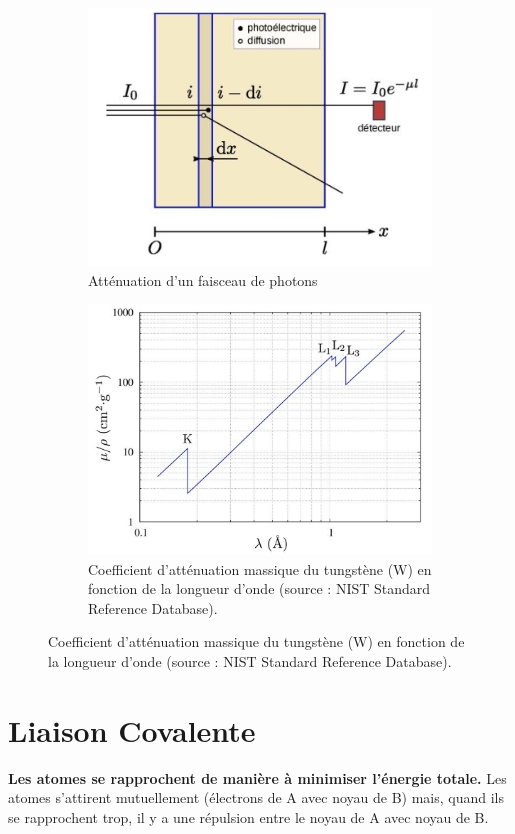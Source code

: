 \documentclass{article}
\begin{document}
\vspace{5mm}
\begin{figure}[h]
    \centering
    \begin{subfigure}{0.48\textwidth}
        \centering
        \includegraphics[width=0.8\linewidth]{Fig/filtre-rx.png}
        \caption{Atténuation d'un faisceau de photons}
        \label{fig:atténuation photons}
    \end{subfigure}
    \hfill\begin{subfigure}{0.48\textwidth}
        \centering
        \includegraphics[width=0.7\linewidth]{Fig/coef_absorption.png}
        \caption{Coefficient d'atténuation massique du tungstène (W) en fonction de la longueur d'onde (source : NIST Standard Reference Database). }
        \label{fig:coef absoption}
    \end{subfigure}
\end{figure}




\section{Liaison Covalente}\label{sec:Liaison covalente}
\textbf{Les atomes se rapprochent de manière à minimiser l'énergie totale.}
Les atomes s'attirent mutuellement (électrons de A avec noyau de B) mais, quand ils se rapprochent trop, il y a une répulsion entre le noyau de A avec noyau de B.
\end{document}

